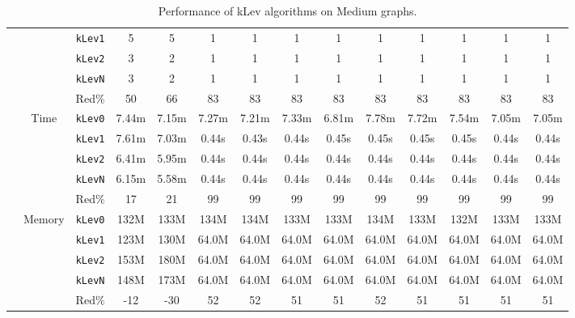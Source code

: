 \begin{table}[h!]
{\begin{tabular}{|l|c|c|c|c|c|c|c|c|c|c|c|c|c|}
& & \texttt{kLev1} & 5 & 5 & 1 & 1 & 1 & 1 & 1 & 1 & 1 & 1 & 1 \\
& & \texttt{kLev2} & 3 & 2 & 1 & 1 & 1 & 1 & 1 & 1 & 1 & 1 & 1 \\
& & \texttt{kLevN} & 3 & 2 & 1 & 1 & 1 & 1 & 1 & 1 & 1 & 1 & 1 \\
& & Red$\%$ & 50 & 66 & 83 & 83 & 83 & 83 & 83 & 83 & 83 & 83 & 83 \\
\cline{2-14} &
\multirow{5}{*}{Time}
& \texttt{kLev0} & 7.44m & 7.15m & 7.27m & 7.21m & 7.33m & 6.81m & 7.78m & 7.72m & 7.54m & 7.05m & 7.05m \\
& & \texttt{kLev1} & 7.61m & 7.03m & 0.44s & 0.43s & 0.44s & 0.45s & 0.45s & 0.45s & 0.45s & 0.44s & 0.44s \\
& & \texttt{kLev2} & 6.41m & 5.95m & 0.44s & 0.44s & 0.44s & 0.44s & 0.44s & 0.44s & 0.44s & 0.44s & 0.44s \\
& & \texttt{kLevN} & 6.15m & 5.58m & 0.44s & 0.44s & 0.44s & 0.44s & 0.44s & 0.44s & 0.44s & 0.44s & 0.44s \\
& & Red$\%$ & 17 & 21 & 99 & 99 & 99 & 99 & 99 & 99 & 99 & 99 & 99 \\
\cline{2-14} &
\multirow{5}{*}{Memory}
& \texttt{kLev0} & 132M & 133M & 134M & 134M & 133M & 133M & 134M & 133M & 132M & 133M & 133M \\
& & \texttt{kLev1} & 123M & 130M & 64.0M & 64.0M & 64.0M & 64.0M & 64.0M & 64.0M & 64.0M & 64.0M & 64.0M \\
& & \texttt{kLev2} & 153M & 180M & 64.0M & 64.0M & 64.0M & 64.0M & 64.0M & 64.0M & 64.0M & 64.0M & 64.0M \\
& & \texttt{kLevN} & 148M & 173M & 64.0M & 64.0M & 64.0M & 64.0M & 64.0M & 64.0M & 64.0M & 64.0M & 64.0M \\
& & Red$\%$ & -12 & -30 & 52 & 52 & 51 & 51 & 52 & 51 & 51 & 51 & 51 \\
\hline
\end{tabular}%
}
\caption{Performance of kLev algorithms on Medium graphs.}
\label{tab:medium_klev}
\end{table}
